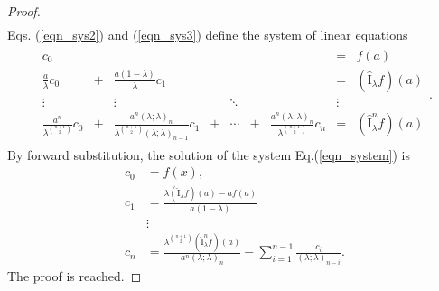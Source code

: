 \documentclass[10pt,a4paper]{amsart}
\newcommand{\I}{\widehat{\mathrm{I}}}
\begin{document}
\begin{proof}
\begin{align}
\end{align}
Eqs. (\ref{eqn_sys2}) and (\ref{eqn_sys3}) define the system of linear equations
\begin{align}\label{eqn_system}
\begin{array}{ccccccccc}
    c_{0}& & & & & & &=&f(a)\\
    \frac{a}{\lambda}c_{0}& + &\frac{a(1-\lambda)}{\lambda}c_{1} & & & & & =&(\I_{\lambda}f)(a)\\
    \vdots& & \vdots &  & \ddots & & &\vdots\\
    \frac{a^n}{\lambda^{\binom{n+1}{2}}}c_{0}& + &\frac{a^n(\lambda;\lambda)_{n}}{\lambda^{\binom{n+1}{2}}(\lambda;\lambda)_{n-1}}c_{1} & + & \cdots &  + &\frac{a^n(\lambda;\lambda)_{n}}{\lambda^{\binom{n+1}{2}}}c_{n} &=&(\I_{\lambda}^nf)(a)
\end{array}.
\end{align}
By forward substitution, the solution of the system Eq.(\ref{eqn_system}) is
\begin{align*}
    c_{0}&=f(x),\\
    c_{1}&=\frac{\lambda(\I_{\lambda}f)(a)-af(a)}{a(1-\lambda)}\\
    &\vdots\\
    c_{n}&=\frac{\lambda^{\binom{n+1}{2}}(\I_{\lambda}^{n}f)(a)}{a^n(\lambda;\lambda)_{n}}-\sum_{i=1}^{n-1}\frac{c_{i}}{(\lambda;\lambda)_{n-i}}.
\end{align*}
The proof is reached.
\end{proof}
\end{document}
